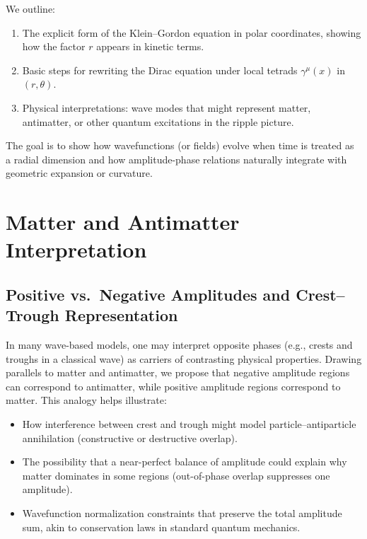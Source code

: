 \documentclass[11pt]{article}
\begin{document}
We outline:
\begin{enumerate}
  \item The explicit form of the Klein--Gordon equation in polar coordinates, 
        showing how the factor \(r\) appears in kinetic terms.
  \item Basic steps for rewriting the Dirac equation under local tetrads 
        \(\gamma^\mu(x)\) in \((r,\theta)\).
  \item Physical interpretations: wave modes that might represent matter, 
        antimatter, or other quantum excitations in the ripple picture.
\end{enumerate}

The goal is to show how wavefunctions (or fields) evolve when time is 
treated as a radial dimension and how amplitude-phase relations naturally 
integrate with geometric expansion or curvature. 


\section{Matter and Antimatter Interpretation}
\label{sec:matter-antimatter}

\subsection{Positive vs.\ Negative Amplitudes and Crest--Trough Representation}
\label{subsec:crest-trough}
In many wave-based models, one may interpret opposite phases (e.g., crests 
and troughs in a classical wave) as carriers of contrasting physical 
properties. Drawing parallels to matter and antimatter, we propose 
that negative amplitude regions can correspond to antimatter, while 
positive amplitude regions correspond to matter. This analogy helps 
illustrate:
\begin{itemize}
  \item How interference between crest and trough might model particle--antiparticle 
        annihilation (constructive or destructive overlap).
  \item The possibility that a near-perfect balance of amplitude could explain 
        why matter dominates in some regions (out-of-phase overlap suppresses 
        one amplitude).
  \item Wavefunction normalization constraints that preserve the total amplitude 
        sum, akin to conservation laws in standard quantum mechanics.
\end{itemize}
\end{document}
